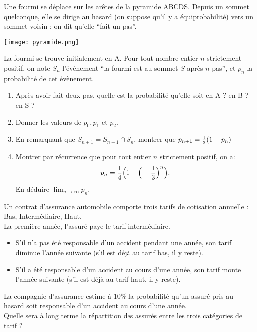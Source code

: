 \bigskip

\begin{exo} Une fourmi se déplace sur les arêtes de la pyramide ABCDS. Depuis un sommet quelconque, elle se dirige au hasard (on suppose qu'il y a équiprobabilité) vers un sommet voisin ; on dit qu'elle ``fait un pas''.
\begin{center}
\texttt{[image: pyramide.png]}
\end{center}
La fourmi se trouve initialement en A. Pour tout nombre entier $n$ strictement positif, on note $S_n$ l'évènement ``la fourmi est au sommet $S$ après $n$ pas'', et $p_n$ la probabilité de cet évènement.
\begin{enumerate}
\item Après avoir fait deux pas, quelle est la probabilité qu'elle soit en A ? en B ? en S ?
\item  Donner les valeurs de $p_0, p_1$ et $p_2$.
\item En remarquant que $S_{n+1}=S_{n+1}\cap {\overline S_n}$, montrer que $p_{n+1}={1\over 3}(1-p_n)$
\item Montrer par récurrence que pour tout entier $n$ strictement positif, on a:
$$p_n= {1\over 4}\Big(1-\Big(-{1\over 3}\Big)^n\Big).$$
En déduire $\lim_{n\rightarrow\infty} p_n$.
\end{enumerate}
\end{exo}

\bigskip

\begin{exo}
Un contrat d'assurance automobile comporte trois tarifs de cotisation annuelle : Bas, Intermédiaire, Haut.\\
La première année, l'assuré paye le tarif intermédiaire.
\begin{itemize}
\item S'il n'a pas été responsable d'un accident pendant une année, son tarif diminue l'année suivante (s'il est déjà au tarif bas, il y reste).
\item S'il a été responsable d'un accident au cours d'une année, son tarif monte l'année suivante (s'il est déjà au tarif haut, il y reste).
\end{itemize}
La compagnie d'assurance estime à 10\% la probabilité qu'un assuré pris au hasard soit responsable d'un accident au cours d'une année.\\
Quelle sera à long terme la répartition des assurés entre les trois catégories de tarif ?\end{exo}

\bigskip

